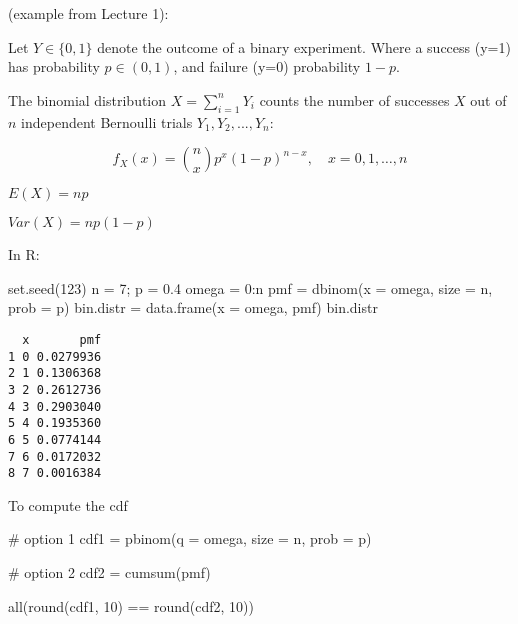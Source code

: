\documentclass[
  letterpaper,
  DIV=11,
  numbers=noendperiod]{scrreprt}
\newenvironment{Shaded}{\begin{snugshade}}{\end{snugshade}}
\newcommand{\AttributeTok}[1]{\textcolor[rgb]{0.40,0.45,0.13}{#1}}
\newcommand{\CommentTok}[1]{\textcolor[rgb]{0.37,0.37,0.37}{#1}}
\newcommand{\DecValTok}[1]{\textcolor[rgb]{0.68,0.00,0.00}{#1}}
\newcommand{\FloatTok}[1]{\textcolor[rgb]{0.68,0.00,0.00}{#1}}
\newcommand{\FunctionTok}[1]{\textcolor[rgb]{0.28,0.35,0.67}{#1}}
\newcommand{\NormalTok}[1]{\textcolor[rgb]{0.00,0.23,0.31}{#1}}
\newcommand{\OtherTok}[1]{\textcolor[rgb]{0.00,0.23,0.31}{#1}}
\newcommand{\SpecialCharTok}[1]{\textcolor[rgb]{0.37,0.37,0.37}{#1}}
\begin{document}
(example from Lecture 1):

Let \(Y \in \{ 0,1\}\) denote the outcome of a binary experiment. Where
a success (y=1) has probability \(p \in(0,1)\), and failure (y=0)
probability \(1-p\).

The binomial distribution \(X = \sum_{i=1}^{n} Y_i\) counts the number
of successes \(X\) out of \(n\) independent Bernoulli trials
\(Y_1, Y_2, ..., Y_n\):

\[
f_X(x) = \binom{n}{x} p^x(1 - p)^{n-x}, \quad x = 0, 1,…, n 
\]

\(E(X) = np\)

\(Var(X) = np(1 - p)\)

In R:

\begin{Shaded}
\begin{Highlighting}[]
\FunctionTok{set.seed}\NormalTok{(}\DecValTok{123}\NormalTok{)}
\NormalTok{n }\OtherTok{=} \DecValTok{7}\NormalTok{; p }\OtherTok{=} \FloatTok{0.4}
\NormalTok{omega }\OtherTok{=} \DecValTok{0}\SpecialCharTok{:}\NormalTok{n}
\NormalTok{pmf }\OtherTok{=} \FunctionTok{dbinom}\NormalTok{(}\AttributeTok{x =}\NormalTok{ omega, }\AttributeTok{size =}\NormalTok{ n, }\AttributeTok{prob =}\NormalTok{ p)}
\NormalTok{bin.distr }\OtherTok{=} \FunctionTok{data.frame}\NormalTok{(}\AttributeTok{x =}\NormalTok{ omega, pmf)}
\NormalTok{bin.distr}
\end{Highlighting}
\end{Shaded}

\begin{verbatim}
  x       pmf
1 0 0.0279936
2 1 0.1306368
3 2 0.2612736
4 3 0.2903040
5 4 0.1935360
6 5 0.0774144
7 6 0.0172032
8 7 0.0016384
\end{verbatim}

To compute the cdf

\begin{Shaded}
\begin{Highlighting}[]
\CommentTok{\# option 1}
\NormalTok{cdf1 }\OtherTok{=} \FunctionTok{pbinom}\NormalTok{(}\AttributeTok{q =}\NormalTok{ omega, }\AttributeTok{size =}\NormalTok{ n, }\AttributeTok{prob =}\NormalTok{ p)}

\CommentTok{\# option 2}
\NormalTok{cdf2 }\OtherTok{=} \FunctionTok{cumsum}\NormalTok{(pmf)}

\FunctionTok{all}\NormalTok{(}\FunctionTok{round}\NormalTok{(cdf1, }\DecValTok{10}\NormalTok{) }\SpecialCharTok{==} \FunctionTok{round}\NormalTok{(cdf2, }\DecValTok{10}\NormalTok{))}
\end{Highlighting}
\end{Shaded}
\end{document}
